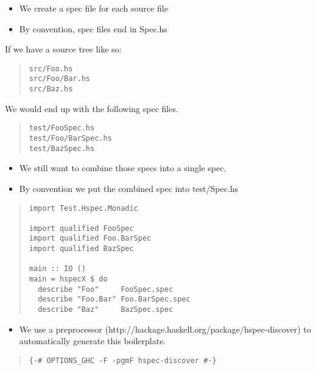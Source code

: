 \documentclass[preprint]{sigplanconf}
\begin{document}
\begin{itemize}
\item We create a spec file for each source file
\item By convention, spec files end in Spec.hs
\end{itemize}

\noindent If we have a source tree like so:

\begin{quote}
\small
\begin{verbatim}
src/Foo.hs
src/Foo/Bar.hs
src/Baz.hs
\end{verbatim}
\end{quote}

\noindent We would end up with the following spec files.

\begin{quote}
\small
\begin{verbatim}
test/FooSpec.hs
test/Foo/BarSpec.hs
test/BazSpec.hs
\end{verbatim}
\end{quote}

\begin{itemize}
\item We still want to combine those specs into a single spec.
\item By convention we put the combined spec into test/Spec.hs
\end{itemize}

\begin{quote}
\small
\begin{verbatim}
import Test.Hspec.Monadic

import qualified FooSpec
import qualified Foo.BarSpec
import qualified BazSpec

main :: IO ()
main = hspecX $ do
  describe "Foo"     FooSpec.spec
  describe "Foo.Bar" Foo.BarSpec.spec
  describe "Baz"     BazSpec.spec
\end{verbatim}
\end{quote}

\begin{itemize}
\item We use a preprocessor (http://hackage.haskell.org/package/hspec-discover) to automatically generate this boilerplate.
\end{itemize}

\begin{quote}
\small
\begin{verbatim}
{-# OPTIONS_GHC -F -pgmF hspec-discover #-}
\end{verbatim}
\end{quote}
\end{document}
